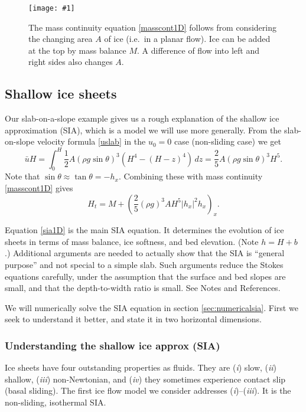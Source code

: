 \documentclass[titlepage,letterpaper,final,12pt]{scrartcl}
\newcommand{\onefigsize}[3]{
\begin{figure}[ht]
\centering
\texttt{[image: \#1]}
\caption{#2}
\label{fig:#1}
\end{figure}}
\begin{document}
\onefigsize{slabmasscontfig}{The mass continuity equation \eqref{masscont1D} follows from considering the changing area $A$ of ice (i.e.~in a planar flow).  Ice can be added at the top by mass balance $M$.  A difference of flow into left and right sides also changes $A$.}{2.5in}


\subsection{Shallow ice sheets}

Our slab-on-a-slope example gives us a rough explanation of the shallow ice approximation (SIA), which is a model we will use more generally.  From the slab-on-slope velocity formula \eqref{uslab} in the $u_0=0$ case (non-sliding case) we get
\begin{equation}
\bar u H = \int_0^H \frac{1}{2} A (\rho g \sin\theta)^3  \left(H^4 - (H-z)^4\right)\,dz = \frac{2}{5} A (\rho g \sin\theta)^3 H^5. \label{siaubar}
\end{equation}
Note that $\sin \theta \approx \tan\theta = - h_x$.  Combining these with mass continuity \eqref{masscont1D} gives
\begin{equation}
  H_t = M + \left(\frac{2}{5} (\rho g)^3 A H^5 |h_x|^2 h_x\right)_x. \label{sia1D}
\end{equation}

Equation \eqref{sia1D} is the main SIA equation.  It determines the evolution of ice sheets in terms of mass balance, ice softness, and bed elevation.  (Note $h=H+b$.)  Additional arguments are needed to actually show that the SIA is ``general purpose'' and not special to a simple slab.  Such arguments reduce the Stokes equations carefully, under the assumption that the surface and bed slopes are small, and that the depth-to-width ratio is small.  See Notes and References.

We will numerically solve the SIA equation in section \ref{sec:numericalsia}.  First we seek to understand it better, and state it in two horizontal dimensions.

\subsubsection*{Understanding the shallow ice approx (SIA)}  Ice sheets have four outstanding properties as fluids.  They are (\emph{i}) slow, (\emph{ii}) shallow,  (\emph{iii}) non-Newtonian, and (\emph{iv}) they sometimes experience contact slip (basal sliding).  The first ice flow model we consider addresses (\emph{i})--(\emph{iii}).  It is the non-sliding, isothermal SIA.
\end{document}
